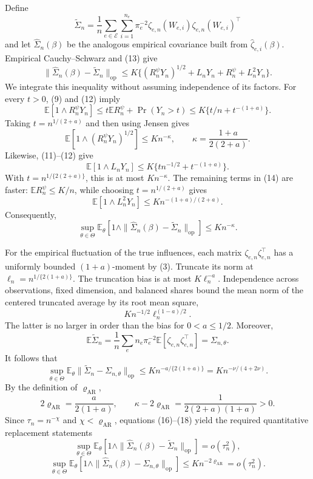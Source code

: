 Define
\[
 \widetilde\Sigma_n=\frac1n\sum_{e\in\mathcal E}\sum_{i=1}^{n_e}\pi_e^{-2}
 \zeta_{e,n}(W_{e,i})\zeta_{e,n}(W_{e,i})^\top
\]
and let \(\widehat\Sigma_n(\beta)\) be the analogous empirical covariance built from \(\widehat\zeta_{e,i}(\beta)\).  Empirical Cauchy--Schwarz and (13) give
\[
 \|\widehat\Sigma_n(\beta)-\widetilde\Sigma_n\|_{\mathrm{op}}
 \leq K\{(R_n^\psi Y_n)^{1/2}+L_nY_n+R_n^\psi+L_n^2Y_n\}. \tag{14}
\]
We integrate this inequality without assuming independence of its factors.  For every \(t>0\), (9) and (12) imply
\[
 \mathbb E[1\wedge R_n^\psi Y_n]
 \leq t\mathbb ER_n^\psi+\Pr(Y_n>t)
 \leq K\{t/n+t^{-(1+a)}\}.
\]
Taking \(t=n^{1/(2+a)}\) and then using Jensen gives
\[
 \mathbb E[1\wedge(R_n^\psi Y_n)^{1/2}]
 \leq K n^{-\kappa},
 \qquad
 \kappa=\frac{1+a}{2(2+a)}. \tag{15}
\]
Likewise, (11)--(12) give
\[
 \mathbb E[1\wedge L_nY_n]
 \leq K\{tn^{-1/2}+t^{-(1+a)}\}.
\]
With \(t=n^{1/\{2(2+a)\}}\), this is at most \(K n^{-\kappa}\).  The remaining terms in (14) are faster: \(\mathbb ER_n^\psi\leq K/n\), while choosing \(t=n^{1/(2+a)}\) gives
\[
 \mathbb E[1\wedge L_n^2Y_n]
 \leq K n^{-(1+a)/(2+a)}.
\]
Consequently,
\[
 \sup_{\theta\in\Theta}\mathbb E_\theta\!\left[
 1\wedge\|\widehat\Sigma_n(\beta)-\widetilde\Sigma_n\|_{\mathrm{op}}
 \right]
 \leq K n^{-\kappa}. \tag{16}
\]

For the empirical fluctuation of the true influences, each matrix \(\zeta_{e,n}\zeta_{e,n}^\top\) has a uniformly bounded \((1+a)\)-moment by (3).  Truncate its norm at \(\ell_n=n^{1/\{2(1+a)\}}\).  The truncation bias is at most \(K\ell_n^{-a}\).  Independence across observations, fixed dimension, and balanced shares bound the mean norm of the centered truncated average by its root mean square,
\[
 K n^{-1/2}\ell_n^{(1-a)/2}.
\]
The latter is no larger in order than the bias for \(0<a\leq1/2\).  Moreover,
\[
 \mathbb E\widetilde\Sigma_n
 =\frac1n\sum_e n_e\pi_e^{-2}\mathbb E[\zeta_{e,n}\zeta_{e,n}^\top]
 =\Sigma_{n,\theta}.
\]
It follows that
\[
 \sup_{\theta\in\Theta}\mathbb E_\theta
 \|\widetilde\Sigma_n-\Sigma_{n,\theta}\|_{\mathrm{op}}
 \leq K n^{-a/\{2(1+a)\}}
 =K n^{-\nu/(4+2\nu)}. \tag{17}
\]
By the definition of \(\varrho_{\mathrm{AR}}\),
\[
 2\varrho_{\mathrm{AR}}=\frac{a}{2(1+a)},
 \qquad
 \kappa-2\varrho_{\mathrm{AR}}
 =\frac{1}{2(2+a)(1+a)}>0. \tag{18}
\]
Since \(\tau_n=n^{-\chi}\) and \(\chi<\varrho_{\mathrm{AR}}\), equations (16)--(18) yield the required quantitative replacement statements
\[
 \sup_{\theta\in\Theta}\mathbb E_\theta\!\left[
 1\wedge\|\widehat\Sigma_n(\beta)-\widetilde\Sigma_n\|_{\mathrm{op}}
 \right]=o(\tau_n^2), \tag{19}
\]
\[
 \sup_{\theta\in\Theta}\mathbb E_\theta\!\left[
 1\wedge\|\widehat\Sigma_n(\beta)-\Sigma_{n,\theta}\|_{\mathrm{op}}
 \right]
 \leq K n^{-2\varrho_{\mathrm{AR}}}=o(\tau_n^2). \tag{20}
\]

